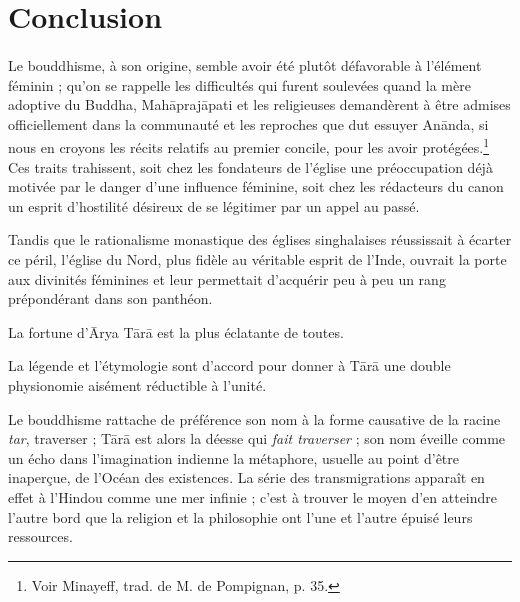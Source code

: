 \documentclass[a4paper, 11pt, oneside, french]{article}
\begin{document}
\section{Conclusion}
\paragraph{}
Le bouddhisme, à son origine, semble avoir été plutôt défavorable à l'élément féminin ; qu'on se rappelle les difficultés qui furent soulevées quand la mère adoptive du Buddha, Mah\={a}praj\={a}pati et les religieuses demandèrent à être admises officiellement dans la communauté et les reproches que dut essuyer An\={a}nda, si nous en croyons les récits relatifs au premier concile, pour les avoir protégées.\footnote{Voir Minayeff, trad. de M. de Pompignan, p. 35.} Ces traits trahissent, soit chez les fondateurs de l'église une préoccupation déjà motivée par le danger d'une influence féminine, soit chez les rédacteurs du canon un esprit d'hostilité désireux de se légitimer par un appel au passé.

Tandis que le rationalisme monastique des églises singhalaises réussissait à écarter ce péril, l'église du Nord, plus fidèle au véritable esprit de l'Inde, ouvrait la porte aux divinités féminines et leur permettait d'acquérir peu à peu un rang prépondérant dans son panthéon.

La fortune d'\={A}rya T\={a}r\={a} est la plus éclatante de toutes.

La légende et l'étymologie sont d'accord pour donner à T\={a}r\={a} une double physionomie aisément réductible à l'unité.

Le bouddhisme rattache de préférence son nom à la forme causative de la racine \emph{tar}, traverser ; T\={a}r\={a} est alors la déesse qui \emph{fait traverser} ; son nom éveille comme un écho dans l'imagination indienne la métaphore, usuelle au point d'être inaperçue, de l'Océan des existences. La série des transmigrations apparaît en effet à l'Hindou comme une mer infinie ; c'est à trouver le moyen d'en atteindre l'autre bord que la religion et la philosophie ont l'une et l'autre épuisé leurs ressources.
\end{document}
